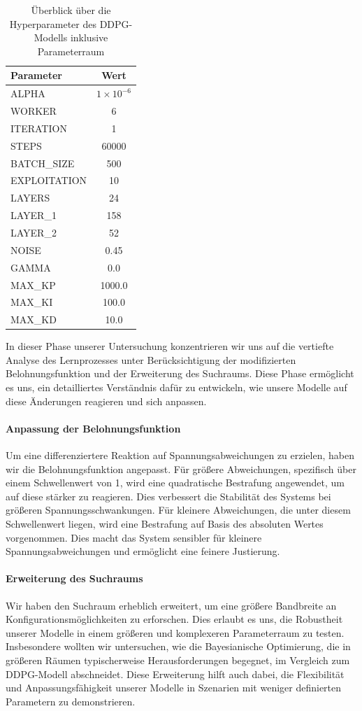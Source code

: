 
\begin{table}[htbp]
\centering
\caption{Überblick über die Hyperparameter des DDPG-Modells inklusive Parameterraum}
\label{tab:hyperparameters_Phase2}
\begin{tabular}{lc}
\hline
\textbf{Parameter} & \textbf{Wert} \\
\hline
ALPHA & \( 1 \times 10^{-6} \) \\
WORKER & 6 \\
ITERATION & 1 \\
STEPS & 60000 \\
BATCH\_SIZE & 500 \\
EXPLOITATION & 10 \\
LAYERS & 24 \\
LAYER\_1 & 158 \\
LAYER\_2 & 52 \\
NOISE & 0.45 \\
GAMMA & 0.0 \\
MAX\_KP & 1000.0 \\
MAX\_KI & 100.0 \\
MAX\_KD & 10.0 \\
\hline
\end{tabular}
\end{table}

In dieser Phase unserer Untersuchung konzentrieren wir uns auf die vertiefte Analyse des Lernprozesses unter Berücksichtigung der modifizierten Belohnungsfunktion und der Erweiterung des Suchraums. Diese Phase ermöglicht es uns, ein detailliertes Verständnis dafür zu entwickeln, wie unsere Modelle auf diese Änderungen reagieren und sich anpassen.

\paragraph{Anpassung der Belohnungsfunktion}
Um eine differenziertere Reaktion auf Spannungsabweichungen zu erzielen, haben wir die Belohnungsfunktion angepasst. Für größere Abweichungen, spezifisch über einem Schwellenwert von 1, wird eine quadratische Bestrafung angewendet, um auf diese stärker zu reagieren. Dies verbessert die Stabilität des Systems bei größeren Spannungsschwankungen. Für kleinere Abweichungen, die unter diesem Schwellenwert liegen, wird eine Bestrafung auf Basis des absoluten Wertes vorgenommen. Dies macht das System sensibler für kleinere Spannungsabweichungen und ermöglicht eine feinere Justierung.

\paragraph{Erweiterung des Suchraums}
Wir haben den Suchraum erheblich erweitert, um eine größere Bandbreite an Konfigurationsmöglichkeiten zu erforschen. Dies erlaubt es uns, die Robustheit unserer Modelle in einem größeren und komplexeren Parameterraum zu testen. Insbesondere wollten wir untersuchen, wie die Bayesianische Optimierung, die in größeren Räumen typischerweise Herausforderungen begegnet, im Vergleich zum DDPG-Modell abschneidet. Diese Erweiterung hilft auch dabei, die Flexibilität und Anpassungsfähigkeit unserer Modelle in Szenarien mit weniger definierten Parametern zu demonstrieren.

